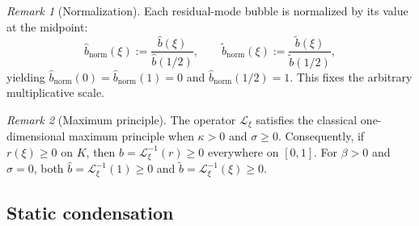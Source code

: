 \documentclass[11pt]{article}
\newcommand{\calL}{\mathcal{L}}
\theoremstyle{remark}
\newtheorem{remark}{Remark}[section]
\begin{document}
\begin{remark}[Normalization]
\label{rem:normalize}
Each residual-mode bubble is normalized by its value at the midpoint:
\begin{equation}
\widehat{b}_{\mathrm{norm}}(\xi) := \frac{\widehat{b}(\xi)}{\widehat{b}(1/2)}, \qquad
\widetilde{b}_{\mathrm{norm}}(\xi) := \frac{\widetilde{b}(\xi)}{\widetilde{b}(1/2)},
\end{equation}
yielding $\widehat{b}_{\mathrm{norm}}(0) = \widehat{b}_{\mathrm{norm}}(1) = 0$ and $\widehat{b}_{\mathrm{norm}}(1/2) = 1$. This fixes the arbitrary multiplicative scale.
\end{remark}

\begin{remark}[Maximum principle]
\label{rem:max_principle}
The operator $\calL_\xi$ satisfies the classical one-dimensional maximum principle when $\kappa > 0$ and $\sigma \geq 0$. Consequently, if $r(\xi) \geq 0$ on $K$, then $b = \calL_\xi^{-1}(r) \geq 0$ everywhere on $[0,1]$. For $\beta > 0$ and $\sigma = 0$, both $\widehat{b} = \calL_\xi^{-1}(1) \geq 0$ and $\widetilde{b} = \calL_\xi^{-1}(\xi) \geq 0$.
\end{remark}

\subsection{Static condensation}
\label{sec:condensation}
\end{document}
